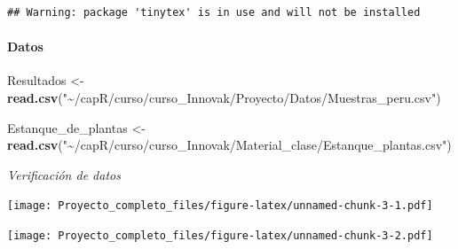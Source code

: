 \documentclass[
]{article}
\newenvironment{Shaded}{\begin{snugshade}}{\end{snugshade}}
\newcommand{\CommentTok}[1]{\textcolor[rgb]{0.56,0.35,0.01}{\textit{#1}}}
\newcommand{\FunctionTok}[1]{\textcolor[rgb]{0.13,0.29,0.53}{\textbf{#1}}}
\newcommand{\NormalTok}[1]{#1}
\newcommand{\OtherTok}[1]{\textcolor[rgb]{0.56,0.35,0.01}{#1}}
\newcommand{\SpecialCharTok}[1]{\textcolor[rgb]{0.81,0.36,0.00}{\textbf{#1}}}
\newcommand{\StringTok}[1]{\textcolor[rgb]{0.31,0.60,0.02}{#1}}
\begin{document}
\begin{verbatim}
## Warning: package 'tinytex' is in use and will not be installed
\end{verbatim}

\hypertarget{datos}{%
\paragraph{Datos}\label{datos}}

\begin{Shaded}
\begin{Highlighting}[]
\NormalTok{Resultados }\OtherTok{\textless{}{-}} \FunctionTok{read.csv}\NormalTok{(}\StringTok{"\textasciitilde{}/capR/curso/curso\_Innovak/Proyecto/Datos/Muestras\_peru.csv"}\NormalTok{)}

\NormalTok{Estanque\_de\_plantas }\OtherTok{\textless{}{-}} \FunctionTok{read.csv}\NormalTok{(}\StringTok{"\textasciitilde{}/capR/curso/curso\_Innovak/Material\_clase/Estanque\_plantas.csv"}\NormalTok{)}
\end{Highlighting}
\end{Shaded}

\emph{Verificación de datos}

\begin{Shaded}
\end{Shaded}

\texttt{[image: Proyecto\_completo\_files/figure-latex/unnamed-chunk-3-1.pdf]}

\begin{Shaded}
\end{Shaded}

\texttt{[image: Proyecto\_completo\_files/figure-latex/unnamed-chunk-3-2.pdf]}

\begin{Shaded}
\end{Shaded}
\end{document}
